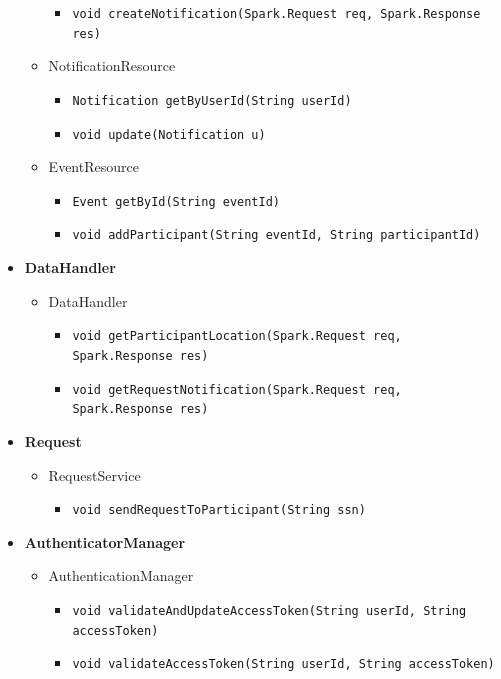 \documentclass[a4paper, hidelinks, 12pt]{report}
\begin{document}
\begin{itemize}
\begin{itemize}
\begin{itemize}
						\item{\verb|void createNotification(Spark.Request req, Spark.Response res)|}
					\end{itemize}
				\item{NotificationResource}
					\begin{itemize}
						\item{\verb|Notification getByUserId(String userId)|}
						\item{\verb|void update(Notification u)|}
					\end{itemize}
				\item{EventResource}
					\begin{itemize}
						\item{\verb|Event getById(String eventId)|}
						\item{\verb|void addParticipant(String eventId, String participantId)|}
					\end{itemize}
			\end{itemize}
		\item{\textbf{DataHandler}}
			\begin{itemize}
				\item{DataHandler}
					\begin{itemize}
						\item{\verb|void getParticipantLocation(Spark.Request req, Spark.Response res)|}
						\item{\verb|void getRequestNotification(Spark.Request req, Spark.Response res)|}
					\end{itemize}
			\end{itemize}
		\item{\textbf{Request}}
			\begin{itemize}
				\item{RequestService}
					\begin{itemize}
						\item{\verb|void sendRequestToParticipant(String ssn)|}
					\end{itemize}
			\end{itemize}
		\item{\textbf{AuthenticatorManager}}
			\begin{itemize}
				\item{AuthenticationManager}
					\begin{itemize}
						\item{\verb|void validateAndUpdateAccessToken(String userId, String accessToken)|}
						\item{\verb|void validateAccessToken(String userId, String accessToken)|}

\end{itemize}
\end{itemize}
\end{itemize}
\end{document}
